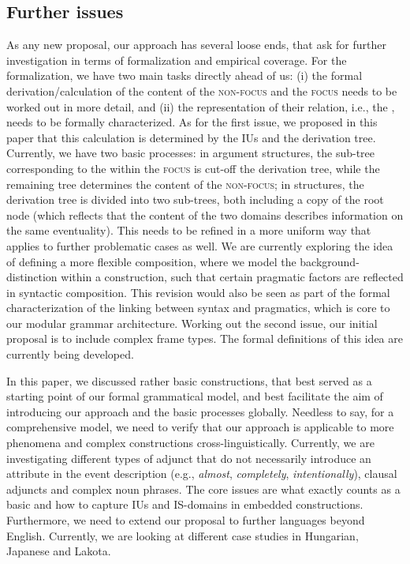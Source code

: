 \documentclass[output=paper,colorlinks,citecolor=brown]{langscibook}
\begin{document}
\subsection{Further issues}
As any new proposal, our approach has several loose ends, that ask for further investigation in terms of formalization and empirical coverage. 
For the formalization, we have two main tasks directly ahead of us: (i) the formal derivation/calculation of the content of the {\textsc{non-focus}} and the {\textsc{focus}} needs to be worked out in more detail, and (ii) the representation of their relation, i.e., the , needs to be formally characterized. As for the first issue, we proposed in this paper that this calculation is determined by the IUs and the derivation tree. Currently, we have two basic processes: in argument  structures, the sub-tree corresponding to the  within the {\textsc{focus}} is cut-off the derivation tree, while the remaining tree determines the content of the {\textsc{non-focus}}; in  structures, the derivation tree is divided into two sub-trees, both including a copy of the root node (which reflects that the content of the two domains describes information on the same eventuality). This needs to be refined in a more uniform way that applies to further problematic cases as well. We are currently exploring the idea of defining a more flexible composition, where we model the background- distinction within a construction, such that certain pragmatic factors are reflected in syntactic composition. This revision would also be seen as part of the formal characterization of the linking between syntax and pragmatics, which is core to our modular grammar architecture. Working out the second issue, our initial proposal is to include complex frame types. The formal definitions of this idea are currently being developed. 

In this paper, we discussed rather basic constructions, that best served as a starting point of our formal grammatical model, and best facilitate the aim of introducing our approach and the basic processes globally. Needless to say, for a comprehensive model, we need to verify that our approach is applicable to more phenomena and complex constructions cross-linguistically. Currently, we are investigating different types of adjunct  that do not necessarily introduce an attribute in the event description (e.g., {\emph{almost}}, {\emph{completely}}, {\emph{intentionally}}), clausal adjuncts and complex noun phrases. The core issues are what exactly counts as a basic  and how to capture IUs and IS-domains in embedded constructions. Furthermore, we need to extend our proposal to further languages beyond English. Currently, we are looking at different case studies in Hungarian, Japanese and Lakota. 
\end{document}
